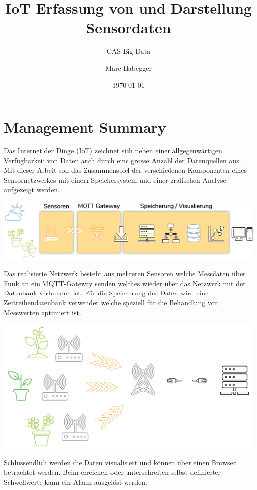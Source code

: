 \documentclass[
  12pt, %
  a4paper, %
  twoside, %
  openany, %
  numbers=noenddot, %
  BCOR=5mm, %
  parskip=half*, %
  thesis, %
]{bfhbook}
\author{Marc Habegger}
\title{IoT Erfassung von und Darstellung Sensordaten}
\subtitle{CAS Big Data}
\date{\today} %
\begin{document}
\maketitle
\frontmatter %

\tableofcontents
\sloppy
\mainmatter %
\chapter*{Management Summary}
Das Internet der Dinge (\Gls{IoT}) zeichnet sich neben einer allgegenwärtigen Verfügbarkeit von Daten auch durch eine grosse Anzahl der Datenquellen aus. Mit dieser Arbeit soll das Zusammenspiel der verschiedenen Komponenten eines Sensornetzwerkes mit einem Speichersystem und einer grafischen Analyse aufgezeigt werden.

  \begin{center}
    \includegraphics[width=18cm, left]{Bilder/Overview.png}
     \captionsetup{justification=centering}
  \end{center}
   
Das realisierte Netzwerk besteht aus mehreren Sensoren welche Messdaten über Funk an ein MQTT-Gateway senden welches wieder über das Netzwerk mit der Datenbank verbunden ist. Für die Speicherung der Daten wird eine Zeitreihendatenbank verwendet welche speziell für die Behandlung von Messwerten optimiert ist.

  \begin{center}
    \includegraphics[width=14cm, left]{Bilder/Overview-2.png}
     \captionsetup{justification=centering}
  \end{center}
  Schlussendlich werden die Daten visualisiert und können über einen Browser betrachtet werden. Beim erreichen oder unterschreiten selbst definierter Schwellwerte kann ein Alarm ausgelöst werden.
\end{document}
